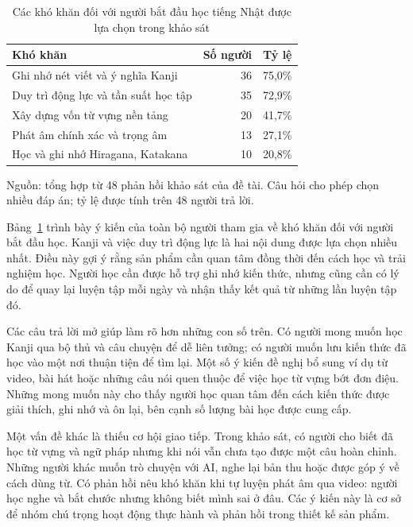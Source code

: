 \begin{table}[htbp]
  \centering
  \caption{Các khó khăn đối với người bắt đầu học tiếng Nhật được lựa chọn trong khảo sát}
  \label{tab:initial-learning-difficulties}
  \begin{tabular}{@{}p{10cm}rr@{}}
    \toprule
    \textbf{Khó khăn} & \textbf{Số người} & \textbf{Tỷ lệ} \\
    \midrule
    Ghi nhớ nét viết và ý nghĩa Kanji & 36 & 75,0\% \\
    Duy trì động lực và tần suất học tập & 35 & 72,9\% \\
    Xây dựng vốn từ vựng nền tảng & 20 & 41,7\% \\
    Phát âm chính xác và trọng âm & 13 & 27,1\% \\
    Học và ghi nhớ Hiragana, Katakana & 10 & 20,8\% \\
    \bottomrule
  \end{tabular}
  \par\smallskip
  {\fontsize{11pt}{14pt}\selectfont Nguồn: tổng hợp từ 48 phản hồi khảo sát của đề tài. Câu hỏi cho phép chọn nhiều đáp án; tỷ lệ được tính trên 48 người trả lời.\par}
\end{table}

Bảng~\ref{tab:initial-learning-difficulties} trình bày ý kiến của toàn bộ người tham gia về khó khăn đối với người bắt đầu học. Kanji và việc duy trì động lực là hai nội dung được lựa chọn nhiều nhất. Điều này gợi ý rằng sản phẩm cần quan tâm đồng thời đến cách học và trải nghiệm học. Người học cần được hỗ trợ ghi nhớ kiến thức, nhưng cũng cần có lý do để quay lại luyện tập mỗi ngày và nhận thấy kết quả từ những lần luyện tập đó.

Các câu trả lời mở giúp làm rõ hơn những con số trên. Có người mong muốn học Kanji qua bộ thủ và câu chuyện để dễ liên tưởng; có người muốn lưu kiến thức đã học vào một nơi thuận tiện để tìm lại. Một số ý kiến đề nghị bổ sung ví dụ từ video, bài hát hoặc những câu nói quen thuộc để việc học từ vựng bớt đơn điệu. Những mong muốn này cho thấy người học quan tâm đến cách kiến thức được giải thích, ghi nhớ và ôn lại, bên cạnh số lượng bài học được cung cấp.

Một vấn đề khác là thiếu cơ hội giao tiếp. Trong khảo sát, có người cho biết đã học từ vựng và ngữ pháp nhưng khi nói vẫn chưa tạo được một câu hoàn chỉnh. Những người khác muốn trò chuyện với AI, nghe lại bản thu hoặc được góp ý về cách dùng từ. Có phản hồi nêu khó khăn khi tự luyện phát âm qua video: người học nghe và bắt chước nhưng không biết mình sai ở đâu. Các ý kiến này là cơ sở để nhóm chú trọng hoạt động thực hành và phản hồi trong thiết kế sản phẩm.

